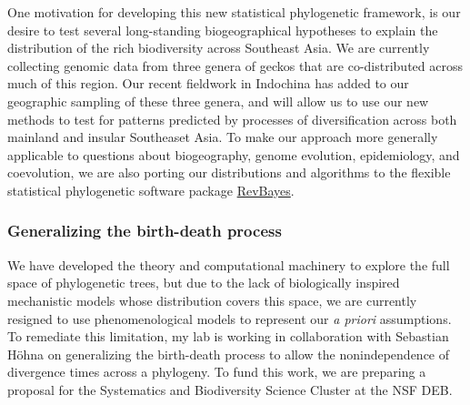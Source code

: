 One motivation for developing this new statistical phylogenetic framework, is
our desire to test several long-standing biogeographical hypotheses to explain
the distribution of the rich biodiversity across Southeast Asia.
We are currently collecting genomic data from three genera of geckos that are
co-distributed across much of this region.
Our recent fieldwork in Indochina has added to our geographic sampling of these
three genera, and will allow us to use our new methods to test for patterns
predicted by processes of diversification across both mainland and insular
Southeaset Asia.
To make our approach more generally applicable to questions about biogeography,
genome evolution, epidemiology, and coevolution,
we are also porting our distributions and algorithms to the flexible
statistical phylogenetic software package
\href{https://revbayes.github.io/}{RevBayes}.

\subsubsection*{Generalizing the birth-death process}
We have developed the theory and computational machinery to explore
the full space of phylogenetic trees, but due to the lack
of biologically inspired mechanistic models whose distribution covers
this space, we are currently resigned to use phenomenological models
to represent our \emph{a priori} assumptions.
To remediate this limitation, my lab is working in collaboration with Sebastian
H{\"o}hna on generalizing the birth-death process to allow the nonindependence
of divergence times across a phylogeny.
To fund this work, we are preparing a proposal for the Systematics and
Biodiversity Science Cluster at the NSF DEB. 

